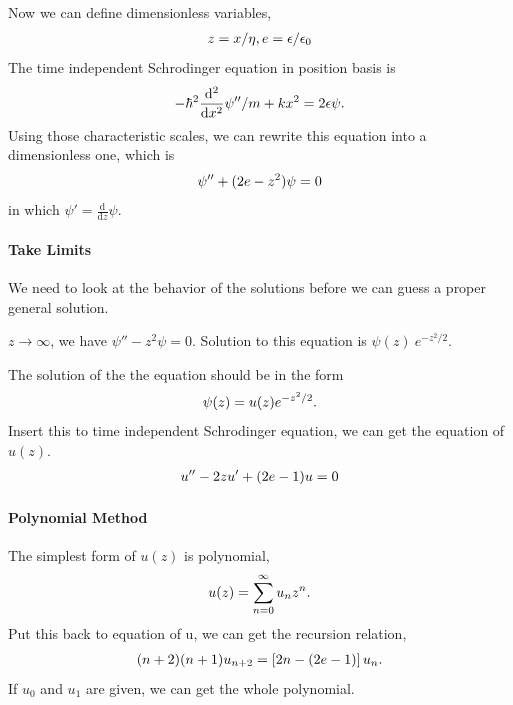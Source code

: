 \documentclass[letterpaper,10pt,english]{sphinxmanual}
\begin{document}
Now we can define dimensionless variables,
\begin{gather}
\begin{split}z=x/\eta, e=\epsilon/\epsilon_0\end{split}\notag
\end{gather}
The time independent Schrodinger equation in position basis is
\begin{gather}
\begin{split}-\hbar^2 \frac{\mathrm d^2}{\mathrm dx^2}\psi'' /m + k x^2 = 2\epsilon \psi .\end{split}\notag
\end{gather}
Using those characteristic scales, we can rewrite this equation into a dimensionless one, which is
\begin{gather}
\begin{split}\psi''+(2e-z^2)\psi = 0\end{split}\notag
\end{gather}
in which \(\psi'=\frac{\mathrm d}{\mathrm dz}\psi\).


\paragraph{Take Limits}
\label{Quantum/QuantumMechanics:take-limits}
We need to look at the behavior of the solutions before we can guess a proper general solution.

\(z\rightarrow \infty\), we have \(\psi''-z^2\psi=0\). Solution to this equation is \(\psi(z)~ e^{-z^2/2}\).

The solution of the the equation should be in the form
\begin{gather}
\begin{split}\psi(z) = u(z) e^{-z^2/2}  .\end{split}\notag
\end{gather}
Insert this to time independent Schrodinger equation, we can get the equation of \(u(z)\).
\begin{gather}
\begin{split}u'' - 2 z u' +(2e-1) u = 0\end{split}\notag
\end{gather}

\paragraph{Polynomial Method}
\label{Quantum/QuantumMechanics:polynomial-method}
The simplest form of \(u(z)\) is polynomial,
\begin{gather}
\begin{split}u(z) = \sum _ {n=0}^{\infty} u _ n z^n  .\end{split}\notag
\end{gather}
Put this back to equation of u, we can get the recursion relation,
\begin{gather}
\begin{split}(n + 2)(n+1) u _ {n+2} = \left[ 2n - (2e - 1) \right] u _ n   .\end{split}\notag
\end{gather}
If \(u_0\) and \(u_1\) are given, we can get the whole polynomial.
\end{document}
